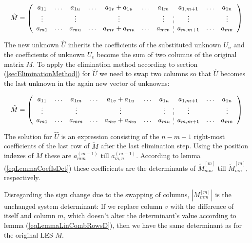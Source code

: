 \begin{equation*}
\hat M =
\left(
\begin{array}{ccccccc:ccc}
a_{11} & \ldots & a_{1u} & \ldots & a_{1v} + a_{1u} & \ldots & a_{1m} & a_{1, m+1} & \ldots & a_{1n} \\
\vdots &        & \vdots &        & \vdots          &        & \vdots & \vdots     &        & \vdots \\
a_{m1} & \ldots & a_{mu} & \ldots & a_{mv} + a_{mu} & \ldots & a_{mm} & a_{m, m+1} & \ldots & a_{mn}
\end{array}
\right)
\end{equation*}

\noindent
The new unknown $\hat U$ inherits the coefficients of the
substituted unknown $U_u$ and the coefficients of unknown $U_v$ become the
sum of two columns of the original matrix $M$. To apply the elimination
method according to section (\ref{secEliminationMethod}) for $\hat U$ we
need to swap two columns so that $\hat U$ becomes the last unknown in the
again new vector of unknowns:

\begin{equation*}
\tilde M =
\left(
\begin{array}{ccccccc:ccc}
a_{11} & \ldots & a_{1m} & \ldots & a_{1v} + a_{1u} & \ldots & a_{1u} & a_{1, m+1} & \ldots & a_{1n} \\
\vdots &        & \vdots &        & \vdots          &        & \vdots & \vdots     &        & \vdots \\
a_{m1} & \ldots & a_{mm} & \ldots & a_{mv} + a_{mu} & \ldots & a_{mu} & a_{m, m+1} & \ldots & a_{mn}
\end{array}
\right)
\end{equation*}

The solution for $\hat U$ is an expression consisting of the $n-m+1$
right-most coefficients of the last row of $\tilde M$ after the last
elimination step. Using the position indexes of $\tilde M$ these are
$a^{(m-1)}_{mm}$ till $a^{(m-1)}_{m,n}$. According to lemma
(\ref{eqLemmaCoefIsDet}) these coefficients are the determinants of
$\tilde M^{[m]}_{mm}$ till $\tilde M^{[m]}_{mn}$, respectively.

Disregarding the sign change due to the swapping of columns,
$|M^{[m]}_{mm}|$ is the unchanged system determinant: If we replace column
$v$ with the difference of itself and column $m$, which doesn't alter the
determinant's value according to lemma (\ref{eqLemmaLinCombRowsD}), then
we have the same determinant as for the original LES $M$.

